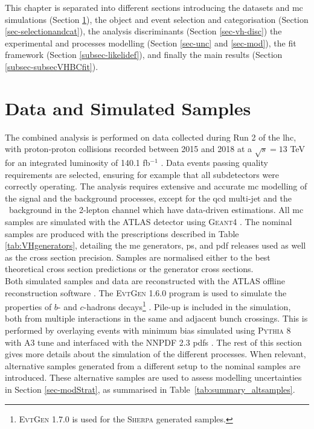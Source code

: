 This chapter is separated into different sections introducing the datasets and \gls{mc} simulations (Section \ref{sec-datasets}), the object and event selection and categorisation (Section \ref{sec-selectionandcat}), the analysis discriminants (Section \ref{sec-vh-disc}) the experimental and processes modelling (Section \ref{sec-unc} and \ref{sec-mod}), the fit framework (Section \ref{subsec-likelidef}), and finally the main results (Section \ref{subsec-subsecVHBCfit}).

\section{Data and Simulated Samples}\label{sec-datasets} 
The combined analysis is performed on data collected during Run 2 of the \gls{lhc}, with proton-proton collisions recorded between 2015 and 2018 at a $\sqrt{s} = 13$ TeV for an integrated luminosity of 140.1 fb$^{-1}$ \cite{ATLAS:2022hro}. Data events passing quality requirements are selected, ensuring for example that all subdetectors were correctly operating. The analysis requires extensive and accurate \gls{mc} modelling of the signal and the background processes, except for the \gls{qcd} multi-jet and the \ttb\ background in the 2-lepton channel which have data-driven estimations. All \gls{mc} samples are simulated with the ATLAS detector \cite{ATLASSimulationInfra} using \textsc{Geant4} \cite{Agostinelli:602040}. The nominal samples are produced with the prescriptions described in Table \ref{tab:VHgenerators}, detailing the \gls{me} generators, \gls{ps}, and \gls{pdf} releases used as well as the cross section precision. Samples are normalised either to the best theoretical cross section predictions or the generator cross sections. \\



Both simulated samples and data are reconstructed with the ATLAS offline reconstruction software \cite{ATL-SOFT-PUB-2021-001}. The \textsc{EvtGen} 1.6.0 program is used to simulate the properties of $b$- and $c$-hadrons decays\footnote{\textsc{EvtGen} 1.7.0 is used for the \textsc{Sherpa} generated samples.} \cite{LANGE2001152}. Pile-up is included in the simulation, both from multiple interactions in the same and adjacent bunch crossings. This is performed by overlaying events with minimum bias simulated using \textsc{\textsc{Pythia}} 8 with A3 tune and interfaced with the \textsc{NNPDF} 2.3 \glspl{pdf} \cite{SJOSTRAND2015159}. The rest of this section gives more details about the simulation of the different processes. When relevant, alternative samples generated from a different setup to the nominal samples are introduced. These alternative samples are used to assess modelling uncertainties in Section \ref{sec-modStrat}, as summarised in Table~\ref{tab:summary_altsamples}.

